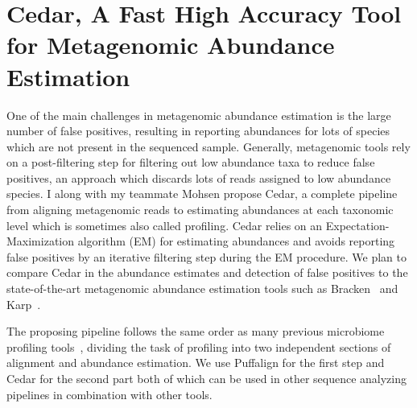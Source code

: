 \section{Cedar, A Fast High Accuracy Tool for Metagenomic Abundance Estimation}
One of the main challenges in metagenomic abundance estimation is the large number of
false positives, resulting in reporting abundances for lots of species
which are not present in the sequenced sample.
Generally, metagenomic tools rely on a post-filtering step for filtering out low abundance taxa
to reduce false positives, an approach which discards lots of reads
assigned to low abundance species.
I along with my teammate Mohsen propose Cedar,
a complete pipeline from aligning metagenomic reads to estimating abundances at each taxonomic level
which is sometimes also called profiling.
Cedar relies on an Expectation-Maximization algorithm (EM) for estimating abundances
and avoids reporting false positives by an iterative filtering step during the EM procedure.
We plan to compare Cedar in the abundance estimates and detection of false positives
to the state-of-the-art metagenomic abundance estimation tools such as Bracken~\cite{} and Karp~\cite{}.

The proposing pipeline follows the same order as many previous microbiome profiling tools~\cite{},
dividing the task of profiling into two independent sections of alignment and abundance estimation.
We use Puffalign for the first step and Cedar for the second part
both of which can be used in other sequence analyzing pipelines in combination with other tools.

